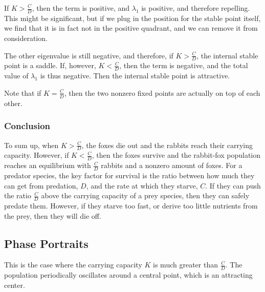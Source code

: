 \documentclass{article}
\begin{document}
If $K > \frac{C}{D}$, then the term is positive, and $\lambda_1$
	is positive, and therefore repelling.
This might be significant, but if we plug in the position for the
	stable point itself, we find that it is in fact not in
	the positive quadrant, and we can remove it from consideration.

The other eigenvalue is still negative, and therefore, if $K > \frac{C}{D}$,
	the internal stable point is a saddle.
If, however, $K < \frac{C}{D}$, then the term is negative,
	and the total value of $\lambda_1$ is thus negative.
Then the internal stable point is attractive.

Note that if $K = \frac{C}{D}$, then the two nonzero fixed points
	are actually on top of each other.

\subsubsection{Conclusion}

To sum up, when $K > \frac{C}{D}$, the foxes die out and the
	rabbits reach their carrying capacity.
However, if $K < \frac{C}{D}$, then the foxes survive
	and the rabbit-fox population reaches an equilibrium
	with $\frac{C}{D}$ rabbits and a nonzero amount of foxes.
For a predator species, the key factor for survival is the ratio
	between how much they can get from predation, $D$,
	and the rate at which they starve, $C$.
If they can push the ratio $\frac{C}{D}$ above the carrying capacity
	of a prey species, then they can safely predate them.
However, if they starve too fast, or derive too little nutrients
	from the prey, then they will die off.

\subsection{Phase Portraits}

This is the case where the carrying capacity $K$ is much greater than
	$\frac{C}{D}$.
The population periodically oscillates around a central point,
	which is an attracting center.
\end{document}
